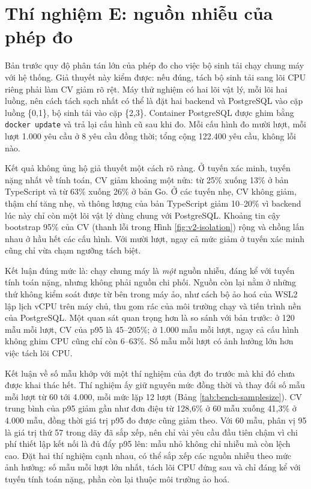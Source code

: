 \section{Thí nghiệm E: nguồn nhiễu của phép đo}
\label{sec:tn-isolation}

Bản trước quy độ phân tán lớn của phép đo cho việc bộ sinh tải chạy chung máy với hệ thống. Giả thuyết này kiểm được: nếu đúng, tách bộ sinh tải sang lõi CPU riêng phải làm CV giảm rõ rệt. Máy thử nghiệm có hai lõi vật lý, mỗi lõi hai luồng, nên cách tách sạch nhất có thể là đặt hai backend và PostgreSQL vào cặp luồng \{0,1\}, bộ sinh tải vào cặp \{2,3\}. Container PostgreSQL được ghim bằng \texttt{docker update} và trả lại cấu hình cũ sau khi đo. Mỗi cấu hình đo mười lượt, mỗi lượt 1.000 yêu cầu ở 8 yêu cầu đồng thời; tổng cộng 122.400 yêu cầu, không lỗi nào.





Kết quả không ủng hộ giả thuyết một cách rõ ràng. Ở tuyến xác minh, tuyến nặng nhất về tính toán, CV giảm khoảng một nửa: từ 25\% xuống 13\% ở bản TypeScript và từ 63\% xuống 26\% ở bản Go. Ở các tuyến nhẹ, CV không giảm, thậm chí tăng nhẹ, và thông lượng của bản TypeScript giảm 10--20\% vì backend lúc này chỉ còn một lõi vật lý dùng chung với PostgreSQL. Khoảng tin cậy bootstrap 95\% của CV (thanh lỗi trong Hình \ref{fig:v2-isolation}) rộng và chồng lấn nhau ở hầu hết các cấu hình. Với mười lượt, ngay cả mức giảm ở tuyến xác minh cũng chỉ vừa chạm ngưỡng tách biệt.

Kết luận đúng mức là: chạy chung máy là \emph{một} nguồn nhiễu, đáng kể với tuyến tính toán nặng, nhưng không phải nguồn chi phối. Nguồn còn lại nằm ở những thứ không kiểm soát được từ bên trong máy ảo, như cách bộ ảo hoá của WSL2 lập lịch vCPU trên máy chủ, thu gom rác của môi trường chạy và tiến trình nền của PostgreSQL. Một quan sát quan trọng hơn là so sánh với bản trước: ở 120 mẫu mỗi lượt, CV của p95 là 45--205\%; ở 1.000 mẫu mỗi lượt, ngay cả cấu hình không ghim CPU cũng chỉ còn 6--63\%. Số mẫu mỗi lượt có ảnh hưởng lớn hơn việc tách lõi CPU.

Kết luận về số mẫu khớp với một thí nghiệm của đợt đo trước mà khi đó chưa được khai thác hết. Thí nghiệm ấy giữ nguyên mức đồng thời và thay đổi số mẫu mỗi lượt từ 60 tới 4.000, mỗi mức lặp 12 lượt (Bảng \ref{tab:bench-samplesize}). CV trung bình của p95 giảm gần như đơn điệu từ 128,6\% ở 60 mẫu xuống 41,3\% ở 4.000 mẫu, đồng thời giá trị p95 đo được cũng giảm theo. Với 60 mẫu, phân vị 95 là giá trị thứ 57 trong dãy đã sắp xếp, nên chỉ vài yêu cầu đầu tiên chậm vì chi phí thiết lập kết nối là đủ đẩy p95 lên: mẫu nhỏ không chỉ nhiễu mà còn lệch cao. Đặt hai thí nghiệm cạnh nhau, có thể sắp xếp các nguồn nhiễu theo mức ảnh hưởng: số mẫu mỗi lượt lớn nhất, tách lõi CPU đứng sau và chỉ đáng kể với tuyến tính toán nặng, phần còn lại thuộc môi trường ảo hoá.

